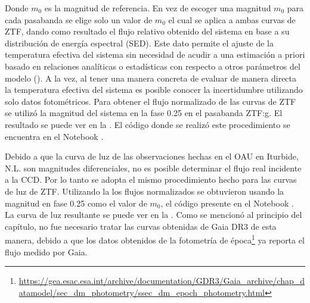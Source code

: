 Donde $m_0$ es la magnitud de referencia. En vez de escoger una magnitud $m_0$
para cada pasabanda se elige solo un valor de $m_0$ el cual se aplica a ambas
curvas de ZTF, dando como resultado el flujo relativo obtenido del sistema en
base a su distribución de energía espectral (SED). Este dato permite el ajuste
de la temperatura efectiva del sistema sin necesidad de acudir a una estimación
a priori basado en relaciones analíticas o estadísticas con respecto a otros
parámetros del modelo
(). A la
vez, al tener una manera concreta de evaluar de manera directa la temperatura
efectiva del sistema es posible conocer la incertidumbre utilizando solo datos
fotométricos. Para obtener el flujo normalizado de las curvas de ZTF se utilizó
la magnitud del sistema en la fase 0.25 en el pasabanda ZTF:g. El resultado se
puede ver en la . El código donde se realizó
este procedimiento se encuentra en el Notebook
\href{https://github.com/KnightIV/UANL_MAPTA_Observaciones/blob/main/analisis/ztf/light-curve-processing.ipynb}{}.

Debido a que la curva de luz de las observaciones hechas en el OAU en Iturbide,
N.L. son magnitudes diferenciales, no es posible determinar el flujo real
incidente a la CCD. Por lo tanto se adopta el mismo procedimiento hecho para las
curvas de luz de ZTF. Utilizando la  los
flujos normalizados se obtuvieron usando la magnitud en fase 0.25 como el valor
de $m_0$, el código presente en el Notebook
\href{https://github.com/KnightIV/UANL_MAPTA_Observaciones/blob/main/analisis/period-analysis/periodogram.ipynb}{}.
La curva de luz resultante se puede ver en la
. Como se mencionó al principio del capítulo,
no fue necesario tratar las curvas obtenidas de Gaia DR3 de esta manera, debido
a que los datos obtenidos de la fotometría de
época\footnote{\url{https://gea.esac.esa.int/archive/documentation/GDR3/Gaia_archive/chap_datamodel/sec_dm_photometry/ssec_dm_epoch_photometry.html}}
ya reporta el flujo medido por Gaia. 

